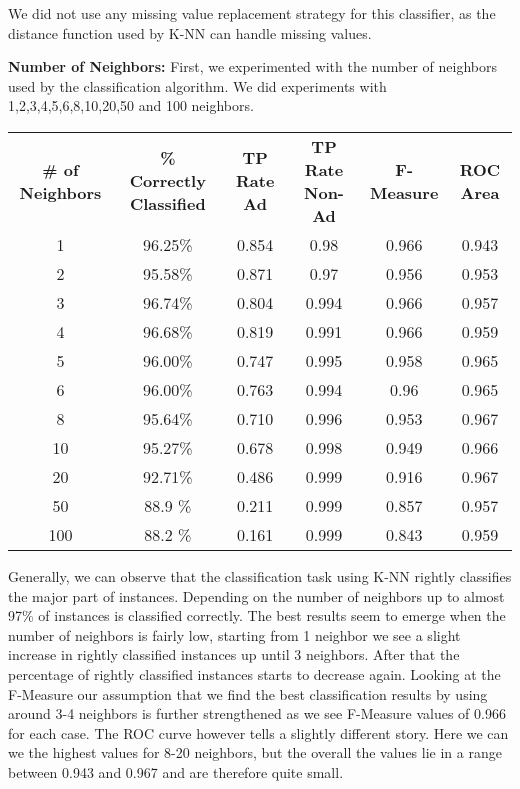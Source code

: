 \documentclass{sig-alternate-05-2015}
\begin{document}
We did not use any missing value replacement strategy for this classifier, as the distance function used by K-NN can handle missing values. 

\textbf{Number of Neighbors:}
First, we experimented with the number of neighbors used by the classification algorithm. We did experiments with 1,2,3,4,5,6,8,10,20,50 and 100 neighbors.

\begin{tabular}{ c | c | c | c | c | c}
\textbf{\# of Neighbors} & \textbf{\% Correctly Classified} & \textbf{TP Rate Ad} & \textbf{TP Rate Non-Ad} & \textbf{F-Measure} & \textbf{ROC Area}\\
1   & 96.25\% & 0.854 & 0.98  & 0.966 & 0.943\\
2   & 95.58\% & 0.871 & 0.97  & 0.956 & 0.953\\
3   & 96.74\% & 0.804 & 0.994 & 0.966 & 0.957\\
4   & 96.68\% & 0.819 & 0.991 & 0.966 & 0.959\\
5   & 96.00\% & 0.747 & 0.995 & 0.958 & 0.965\\
6   & 96.00\% & 0.763 & 0.994 & 0.96  & 0.965\\
8   & 95.64\% & 0.710 & 0.996 & 0.953 & 0.967\\
10  & 95.27\% & 0.678 & 0.998 & 0.949 & 0.966\\
20  & 92.71\% & 0.486 & 0.999 & 0.916 & 0.967\\
50  & 88.9 \% & 0.211 & 0.999 & 0.857 & 0.957\\
100 & 88.2 \% & 0.161 & 0.999 & 0.843 & 0.959\\
\end{tabular}

Generally, we can observe that the classification task using K-NN rightly classifies the major part of instances. Depending on the number of neighbors up to almost 97\% of instances is classified correctly. The best results seem to emerge when the number of neighbors is fairly low, starting from 1 neighbor we see a slight increase in rightly classified instances up until 3 neighbors. After that the percentage of rightly classified instances starts to decrease again. Looking at the F-Measure our assumption that we find the best classification results by using around 3-4 neighbors is further strengthened as we see F-Measure values of 0.966 for each case. The ROC curve however tells a slightly different story. Here we can we the highest values for 8-20 neighbors, but the overall the values lie in a range between 0.943 and 0.967 and are therefore quite small.
\end{document}
